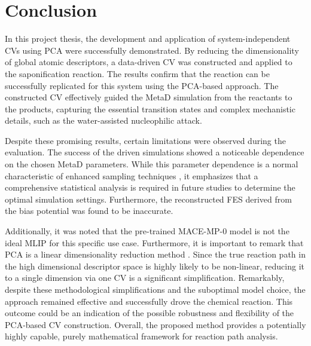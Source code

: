 {}
\chapter*{Conclusion}%

In this project thesis, the development and application of system-independent CVs using PCA were successfully demonstrated. 
By reducing the dimensionality of global atomic descriptors, a data-driven CV was constructed and applied to the saponification reaction. 
The results confirm that the reaction can be successfully replicated for this system using the PCA-based approach. 
The constructed CV effectively guided the MetaD simulation from the reactants to the products, capturing the essential transition states and complex mechanistic details, such as the water-assisted nucleophilic attack.

Despite these promising results, certain limitations were observed during the evaluation. 
The success of the driven simulations showed a noticeable dependence on the chosen MetaD parameters. 
While this parameter dependence is a normal characteristic of enhanced sampling techniques \cite{Laio2008}, 
it emphasizes that a comprehensive statistical analysis is required in future studies to determine the optimal simulation settings. 
Furthermore, the reconstructed FES derived from the bias potential was found to be inaccurate. 

Additionally, it was noted that the pre-trained MACE-MP-0 model is not the ideal MLIP for this specific use case.
Furthermore, it is important to remark that PCA is a linear dimensionality reduction method \cite{Jolliffe2002}. 
Since the true reaction path in the high dimensional descriptor space is highly likely to be non-linear, 
reducing it to a single dimension via one CV is a significant simplification.
Remarkably, despite these methodological simplifications and the suboptimal model choice, the approach remained effective and successfully drove the chemical reaction. 
This outcome could be an indication of the possible robustness and flexibility of the PCA-based CV construction. 
Overall, the proposed method provides a potentially highly capable, purely mathematical framework for reaction path analysis. 

